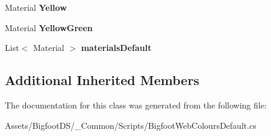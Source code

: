 \begin{DoxyCompactItemize}
Material {\bfseries Yellow}
\item 
\mbox{\label{class_bigfoot_d_s_1_1_bigfoot_web_colours_default_add16c183b01d5156a1de78cce0d949a9}} 
Material {\bfseries Yellow\+Green}
\item 
\mbox{\label{class_bigfoot_d_s_1_1_bigfoot_web_colours_default_a16d891af8ea4671fac61695ffbe256dd}} 
List$<$ Material $>$ {\bfseries materials\+Default}
\end{DoxyCompactItemize}
\subsection*{Additional Inherited Members}


The documentation for this class was generated from the following file\+:\begin{DoxyCompactItemize}
\item 
Assets/\+Bigfoot\+D\+S/\+\_\+\+Common/\+Scripts/Bigfoot\+Web\+Colours\+Default.\+cs\end{DoxyCompactItemize}
